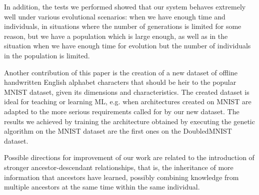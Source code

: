 \documentclass[eng]{simposium}
\begin{document}
In addition, the tests we performed showed that our system behaves extremely well under various evolutional scenarios: 
when we have enough time and individuals, in situations where the number of generations is limited for some reason, but we have 
a population which is large enough, 
as well as in the situation when we have enough time for evolution but the number of individuals in the population is limited. 

Another contribution of this paper is the creation of a new dataset of offline handwritten English alphabet characters that should be 
heir to the popular MNIST dataset, given its dimensions and characteristics. The created dataset is ideal 
for teaching or learning ML, e.g. when architectures created on MNIST are adapted to the more serious requirements called for  
by our new dataset. 
The results we achieved by training the architecture obtained by executing the genetic algorithm on the MNIST dataset are 
the first ones on the DoubledMNIST dataset. 

Possible directions for improvement of our work are related to the introduction of stronger ancestor-descendant relationships, 
that is, the inheritance of more information that ancestors have learned, possibly combining knowledge from multiple ancestors 
at the same time within the same individual. 
\end{document}
